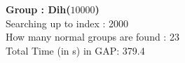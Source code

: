 \textbf{Group : Dih($10000$)}\\
Searching up to index : 2000\\
How many normal groups are found : 23\\
Total Time (in s) in GAP: 379.4\\

